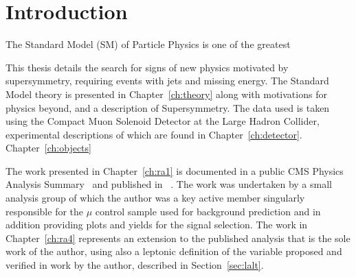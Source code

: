\setcounter{equation}{0}
\setcounter{figure}{0}
\setcounter{table}{0}

\chapter{\label{chapter1} Introduction}

The Standard Model (SM) of Particle Physics is one of the greatest 


This thesis details the search for signs of new physics motivated by supersymmetry, requiring events with jets and missing energy. The Standard Model theory is presented in Chapter~\ref{ch:theory} along with motivations for physics beyond, and a description of Supersymmetry. The data used is taken using the Compact Muon Solenoid Detector at the Large Hadron Collider, experimental descriptions of which are found in Chapter~\ref{ch:detector}. Chapter~\ref{ch:objects} 


The work presented in Chapter~\ref{ch:ra1} is documented in a public CMS Physics Analysis Summary~\cite{} and published in ~\cite{1}. The work was undertaken by a small analysis group of which the author was a key active member singularly responsible for the $\mu$ control sample used for background prediction and in addition providing plots and yields for the signal selection. The work in Chapter~\ref{ch:ra4} represents an extension to the published analysis that is the sole work of the author, using also a leptonic definition of the \alt variable proposed and verified in work by the author, described in Section~\ref{sec:lalt}. 




